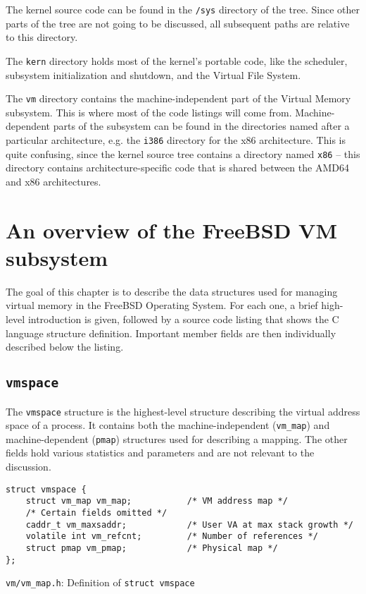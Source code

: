 \documentclass[shortabstract, english]{iithesis}
\begin{document}
The kernel source code can be found in the \texttt{/sys} directory of the tree.
Since other parts of the tree are not going to be discussed, all subsequent
paths are relative to this directory.

The \texttt{kern} directory holds most of the kernel's portable code, like the
scheduler, subsystem initialization and shutdown, and the Virtual File System.

The \texttt{vm} directory contains the machine-independent part of the Virtual
Memory subsystem. This is where most of the code listings will come from.
Machine-dependent parts of the subsystem can be found in the directories named
after a particular architecture, e.g. the \texttt{i386} directory for the x86
architecture. This is quite confusing, since the kernel source tree contains a
directory named \texttt{x86} -- this directory contains architecture-specific
code that is shared between the AMD64 and x86 architectures.

\chapter{An overview of the FreeBSD VM subsystem}

The goal of this chapter is to describe the data structures used for managing
virtual memory in the FreeBSD Operating System. For each one, a brief high-level
introduction is given, followed by a source code listing that shows the C
language structure definition. Important member fields are then individually
described below the listing.

\section{\texttt{vmspace}}

The \texttt{vmspace} structure is the highest-level structure describing the
virtual address space of a process. It contains both the machine-independent
(\texttt{vm\_map}) and machine-dependent (\texttt{pmap}) structures used for
describing a mapping. The other fields hold various statistics and parameters
and are not relevant to the discussion.

\begin{listing}[H]
\begin{verbatim}
struct vmspace {
    struct vm_map vm_map;           /* VM address map */
    /* Certain fields omitted */
    caddr_t vm_maxsaddr;            /* User VA at max stack growth */
    volatile int vm_refcnt;         /* Number of references */
    struct pmap vm_pmap;            /* Physical map */
};
\end{verbatim}
\caption{\texttt{vm/vm\_map.h}: Definition of \texttt{struct vmspace}}
\end{listing}
\end{document}
